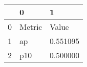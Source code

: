 \begin{tabular}{lll}
\toprule
 & 0 & 1 \\
\midrule
0 & Metric & Value \\
1 & ap & 0.551095 \\
2 & p10 & 0.500000 \\
\bottomrule
\end{tabular}

